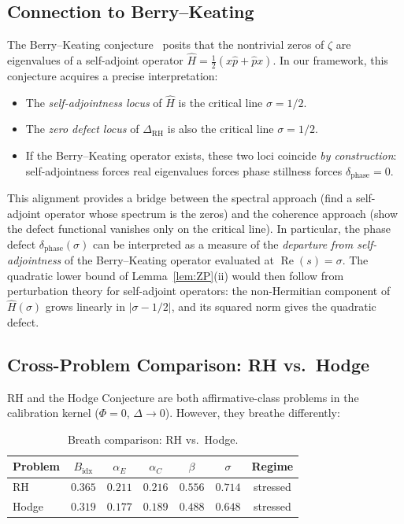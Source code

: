 \documentclass[11pt]{article}
\theoremstyle{remark}
\DeclareMathOperator{\Rea}{Re}
\begin{document}
\subsection{Connection to Berry--Keating}
\label{subsec:disc-berry-keating}

The Berry--Keating conjecture~\cite{BK} posits that the nontrivial zeros of $\zeta$
are eigenvalues of a self-adjoint operator $\hat{H} = \tfrac{1}{2}(x\hat{p} + \hat{p}x)$.
In our framework, this conjecture acquires a precise interpretation:

\begin{itemize}
  \item The \emph{self-adjointness locus} of $\hat{H}$ is the critical line
    $\sigma = 1/2$.
  \item The \emph{zero defect locus} of $\Delta_{\mathrm{RH}}$ is also the critical
    line $\sigma = 1/2$.
  \item If the Berry--Keating operator exists, these two loci coincide \emph{by construction}:
    self-adjointness forces real eigenvalues forces phase stillness forces
    $\delta_{\mathrm{phase}} = 0$.
\end{itemize}

\noindent
This alignment provides a bridge between the spectral approach (find a self-adjoint
operator whose spectrum is the zeros) and the coherence approach (show the defect
functional vanishes only on the critical line).
In particular, the phase defect $\delta_{\mathrm{phase}}(\sigma)$ can be interpreted
as a measure of the \emph{departure from self-adjointness} of the Berry--Keating
operator evaluated at $\Rea(s) = \sigma$.
The quadratic lower bound of Lemma~\ref{lem:ZP}(ii) would then follow from
perturbation theory for self-adjoint operators: the non-Hermitian component of
$\hat{H}(\sigma)$ grows linearly in $|\sigma - 1/2|$, and its squared norm gives
the quadratic defect.

\subsection{Cross-Problem Comparison: RH vs.\ Hodge}
\label{subsec:disc-cross}

RH and the Hodge Conjecture are both affirmative-class problems in the calibration
kernel ($\Phi = 0$, $\Delta \to 0$).
However, they breathe differently:

\begin{table}[ht]
\centering
\begin{tabular}{@{}lcccccc@{}}
\toprule
Problem & $B_{\mathrm{idx}}$ & $\alpha_E$ & $\alpha_C$ & $\beta$ & $\sigma$ & Regime \\
\midrule
RH    & $0.365$ & $0.211$ & $0.216$ & $0.556$ & $0.714$ & stressed \\
Hodge & $0.319$ & $0.177$ & $0.189$ & $0.488$ & $0.648$ & stressed \\
\bottomrule
\end{tabular}
\caption{Breath comparison: RH vs.\ Hodge.}
\label{tab:rh-hodge-breath}
\end{table}
\end{document}
